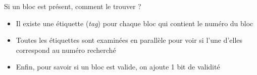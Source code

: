 %
\begin{Frame}{Si un bloc est présent, comment le trouver ?}


      \begin{block}{}{}
        \begin{itemize}
        \item Il existe une étiquette (\emph{tag}) pour chaque bloc qui contient le numéro du bloc
	\item Toutes les étiquettes sont examinées en parallèle pour voir si l'une d'elles correspond au numéro recherché
	\item Enfin, pour savoir si un bloc est valide, on ajoute 1 bit de validité
        \end{itemize}
      \end{block} 

      
\end{Frame}


